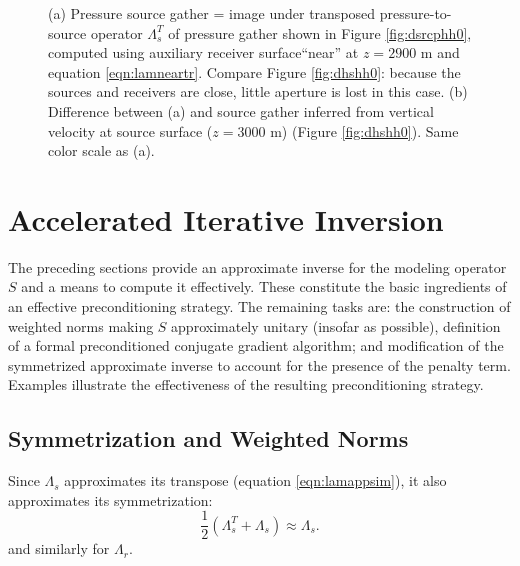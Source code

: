 \documentclass[georeport,12pt]{geophysics}
\begin{document}
\begin{figure}
  \centering
  \caption{(a) Pressure source gather = image
  under transposed pressure-to-source operator $\Lambda_s^T$ of pressure gather
  shown in Figure \ref{fig:dsrcphh0}, computed using
  auxiliary receiver surface``near''  at $z=2900$ m and equation \ref{eqn:lamneartr}. Compare Figure
  \ref{fig:dhshh0}: because the sources and
  receivers are close, little aperture is lost in this case. (b) Difference between (a) 
  and source gather inferred from vertical velocity at source
  surface ($z=3000$ m) (Figure \ref{fig:dhshh0}). Same color scale as (a).}
\end{figure}



\section{Accelerated Iterative Inversion}

The preceding sections provide an approximate inverse for the modeling
operator $S$ and a means to compute it effectively. These constitute
the basic ingredients of an effective preconditioning strategy. The
remaining tasks are: the construction of weighted norms making $S$
approximately unitary (insofar as possible), definition of a formal
preconditioned conjugate gradient algorithm; and modification of the
symmetrized approximate inverse to account for the presence of the
penalty term. Examples illustrate the effectiveness of the resulting
preconditioning strategy.

\subsection{Symmetrization and Weighted Norms}
Since $\Lambda_s$ approximates its transpose (equation \ref{eqn:lamappsim}), it also approximates its
 symmetrization:
\begin{equation}
  \label{eqn:lamsymm}
  \frac{1}{2}(\Lambda_s^T+\Lambda_s) \approx \Lambda_s.
\end{equation}
and similarly for $\Lambda_r$.
\end{document}

